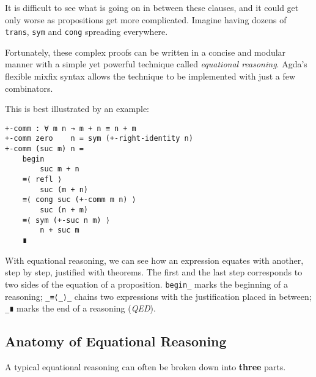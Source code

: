 \documentclass[../thesis.tex]{subfiles}
\begin{document}
It is difficult to see what is going on in between these clauses, and it could
get only worse as propositions get more complicated.
Imagine having dozens of {\lstinline|trans|}, {\lstinline|sym|} and {\lstinline|cong|}
spreading everywhere.

Fortunately, these complex proofs can be written in a concise and modular manner
with a simple yet powerful technique called \textit{equational reasoning}.
Agda's flexible mixfix syntax allows the technique to be implemented with just
a few combinators\cite{erikhesselinkpaulvisschers2008}.

This is best illustrated by an example:

\begin{lstlisting}
+-comm : ∀ m n → m + n ≡ n + m
+-comm zero    n = sym (+-right-identity n)
+-comm (suc m) n =
    begin
        suc m + n
    ≡⟨ refl ⟩
        suc (m + n)
    ≡⟨ cong suc (+-comm m n) ⟩
        suc (n + m)
    ≡⟨ sym (+-suc n m) ⟩
        n + suc m
    ∎
\end{lstlisting}

With equational reasoning, we can see how an expression equates with another,
step by step, justified with theorems. The first and the last step corresponds to
two sides of the equation of a proposition. {\lstinline|begin_|} marks the beginning
of a reasoning; {\lstinline|_≡⟨_⟩_|} chains two expressions with the justification
placed in between; {\lstinline|_∎|} marks the end of a reasoning (\textit{QED}).

\subsection{Anatomy of Equational Reasoning}

A typical equational reasoning can often be broken down into \textbf{three} parts.
\end{document}
